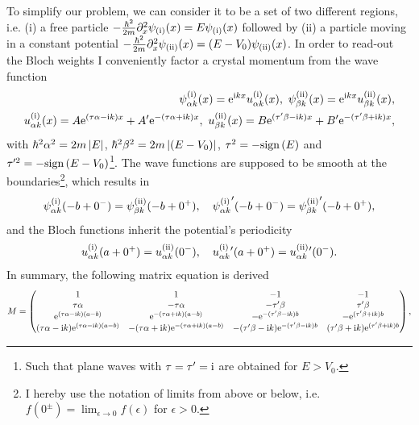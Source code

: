 To simplify our problem, we can consider it to be a set of two different regions, i.e. (i) a free particle $-\frac{\hbar^2}{2m}\partial_x^2\psi_{\rm (i)}(x) = E\psi_{\rm (i)}(x)$ followed by (ii) a particle moving in a constant potential $-\frac{\hbar^2}{2m}\partial_x^2\psi_{\rm (ii)}(x) = (E-V_0)\psi_{\rm (ii)}(x)$.
In order to read-out the Bloch weights I conveniently factor a crystal momentum from the wave function
\begin{align}
    \psi_{\alpha k}^{\rm (i)}(x) = \mathrm e^{\mathrm i kx}u_{\alpha k}^{\rm (i)}(x),
    \
    \psi_{\beta k}^{\rm (ii)}(x) = \mathrm e^{\mathrm i kx}u_{\beta k}^{\rm (ii)}(x),
    \\
    u_{\alpha k}^{\rm (i)}(x) = A\mathrm e^{(\tau\alpha-\mathrm i k) x} + A'\mathrm e^{-(\tau\alpha+\mathrm i k) x},
    \
    u_{\beta k}^{\rm (ii)}(x) = B\mathrm e^{(\tau'\beta-\mathrm i k) x} + B'\mathrm e^{-(\tau'\beta+\mathrm i k) x},
\end{align}
with $\hbar^2\alpha^2 = 2m\left| E \right|$, $\hbar^2\beta^2 = 2m\left| (E-V_0) \right|$, $\tau^2=-\text{sign}\left( E \right)$ and $\tau'^2=-\text{sign}\left( E-V_0 \right)$\footnote{Such that plane waves with $\tau=\tau'=\mathrm i$ are obtained for $E>V_0$.}.
The wave functions are supposed to be smooth at the boundaries\footnote{I hereby use the notation of limits from above or below, i.e. $f(0^\pm)=\lim_{\epsilon\rightarrow0}f(\epsilon)$ for $\epsilon>0$.}, which results in
\begin{align}
    \psi_{\alpha k}^{\rm (i)}(-b+0^-)=\psi_{\beta k}^{\rm (ii)}(-b+0^+),
    \quad
    {\psi_{\alpha k}^{\rm (i)}}'(-b+0^-)={\psi_{\beta k}^{\rm (ii)}}'(-b+0^+),
\end{align}
and the Bloch functions inherit the potential's periodicity
\begin{align}
    u_{\alpha k}^{\rm (i)}(a+0^+) = u_{\alpha k}^{\rm (ii)}(0^-),
    \quad
    u_{\alpha k}^{\rm (i)}{}'(a+0^+) = u_{\alpha k}^{\rm (ii)}{}'(0^-).
\end{align}
In summary, the following matrix equation is derived
\begin{align}
    M=\begin{pmatrix}
        1 & 1 & -1 & -1\\
        \tau\alpha & -\tau\alpha & -\tau'\beta & \tau'\beta\\
        \mathrm e^{(\tau \alpha-\mathrm i k)(a-b)}  & \mathrm e^{-(\tau \alpha+\mathrm i k) (a-b)} &
        -\mathrm e^{-(\tau'\beta -\mathrm i k)b}     & -\mathrm e^{ (\tau'\beta+\mathrm i k)b} \\
        (\tau \alpha-\mathrm i k)\mathrm e^{(\tau \alpha-\mathrm i k)(a-b)}  & -(\tau \alpha+\mathrm i k)\mathrm e^{-(\tau \alpha+\mathrm i k) (a-b)} &
        -(\tau'\beta -\mathrm i k)\mathrm e^{-(\tau'\beta -\mathrm i k)b}     & (\tau'\beta+\mathrm i k)\mathrm e^{ (\tau'\beta+\mathrm i k)b} \\
    \end{pmatrix},
\end{align}
